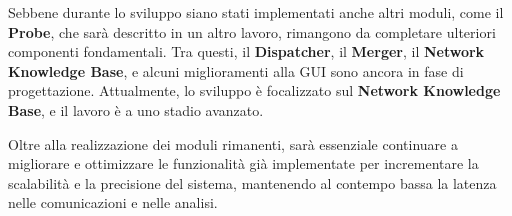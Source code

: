 \documentclass[target=bach,aauheader=,style=]{thud}
\begin{document}
Sebbene durante lo sviluppo siano stati implementati anche altri moduli, come il \textbf{Probe}, che sarà descritto in un altro lavoro, rimangono da completare ulteriori componenti fondamentali. Tra questi, il \textbf{Dispatcher}, il \textbf{Merger}, il \textbf{Network Knowledge Base}, e alcuni miglioramenti alla GUI sono ancora in fase di progettazione. Attualmente, lo sviluppo è focalizzato sul \textbf{Network Knowledge Base}, e il lavoro è a uno stadio avanzato.

Oltre alla realizzazione dei moduli rimanenti, sarà essenziale continuare a migliorare e ottimizzare le funzionalità già implementate per incrementare la scalabilità e la precisione del sistema, mantenendo al contempo bassa la latenza nelle comunicazioni e nelle analisi.




\backmatter




\end{document}
